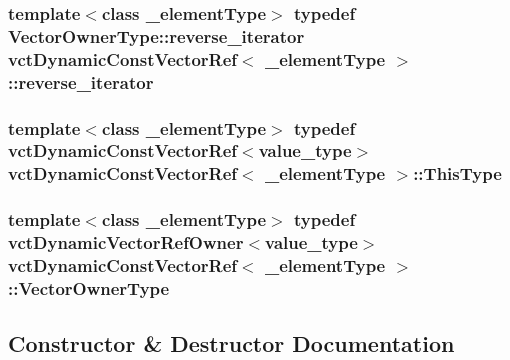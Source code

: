 \subsubsection[{reverse\+\_\+iterator}]{\setlength{\rightskip}{0pt plus 5cm}template$<$class \+\_\+element\+Type$>$ typedef {\bf Vector\+Owner\+Type\+::reverse\+\_\+iterator} {\bf vct\+Dynamic\+Const\+Vector\+Ref}$<$ \+\_\+element\+Type $>$\+::{\bf reverse\+\_\+iterator}}\label{classvct_dynamic_const_vector_ref_a0f78f6ce35765714ea4dc8c182c6dc73}
\hypertarget{classvct_dynamic_const_vector_ref_a8da0588e2e355e6224badfd42845195e}{}
\subsubsection[{This\+Type}]{\setlength{\rightskip}{0pt plus 5cm}template$<$class \+\_\+element\+Type$>$ typedef {\bf vct\+Dynamic\+Const\+Vector\+Ref}$<$value\+\_\+type$>$ {\bf vct\+Dynamic\+Const\+Vector\+Ref}$<$ \+\_\+element\+Type $>$\+::{\bf This\+Type}}\label{classvct_dynamic_const_vector_ref_a8da0588e2e355e6224badfd42845195e}
\hypertarget{classvct_dynamic_const_vector_ref_a3399abece6e1a8d528f82fa8148a751d}{}
\subsubsection[{Vector\+Owner\+Type}]{\setlength{\rightskip}{0pt plus 5cm}template$<$class \+\_\+element\+Type$>$ typedef {\bf vct\+Dynamic\+Vector\+Ref\+Owner}$<$value\+\_\+type$>$ {\bf vct\+Dynamic\+Const\+Vector\+Ref}$<$ \+\_\+element\+Type $>$\+::{\bf Vector\+Owner\+Type}}\label{classvct_dynamic_const_vector_ref_a3399abece6e1a8d528f82fa8148a751d}


\subsection{Constructor \& Destructor Documentation}
\hypertarget{classvct_dynamic_const_vector_ref_a6a664d6feac7f6b9ec7e6102a8752383}{}

